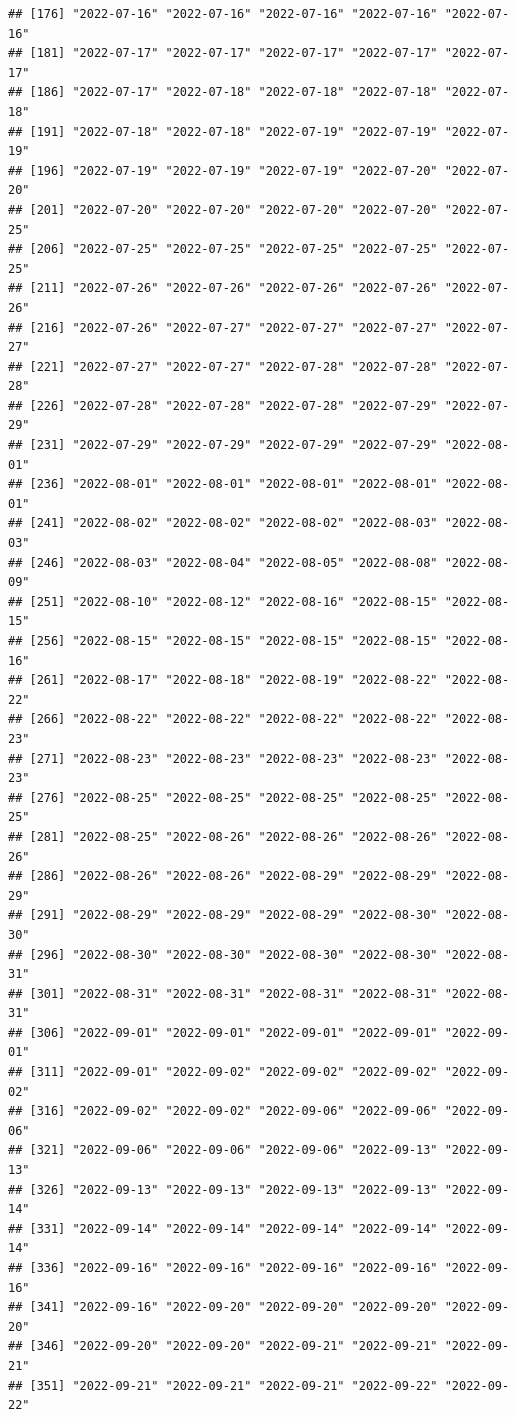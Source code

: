 \documentclass[
]{article}
\begin{document}
\begin{verbatim}
## [176] "2022-07-16" "2022-07-16" "2022-07-16" "2022-07-16" "2022-07-16"
## [181] "2022-07-17" "2022-07-17" "2022-07-17" "2022-07-17" "2022-07-17"
## [186] "2022-07-17" "2022-07-18" "2022-07-18" "2022-07-18" "2022-07-18"
## [191] "2022-07-18" "2022-07-18" "2022-07-19" "2022-07-19" "2022-07-19"
## [196] "2022-07-19" "2022-07-19" "2022-07-19" "2022-07-20" "2022-07-20"
## [201] "2022-07-20" "2022-07-20" "2022-07-20" "2022-07-20" "2022-07-25"
## [206] "2022-07-25" "2022-07-25" "2022-07-25" "2022-07-25" "2022-07-25"
## [211] "2022-07-26" "2022-07-26" "2022-07-26" "2022-07-26" "2022-07-26"
## [216] "2022-07-26" "2022-07-27" "2022-07-27" "2022-07-27" "2022-07-27"
## [221] "2022-07-27" "2022-07-27" "2022-07-28" "2022-07-28" "2022-07-28"
## [226] "2022-07-28" "2022-07-28" "2022-07-28" "2022-07-29" "2022-07-29"
## [231] "2022-07-29" "2022-07-29" "2022-07-29" "2022-07-29" "2022-08-01"
## [236] "2022-08-01" "2022-08-01" "2022-08-01" "2022-08-01" "2022-08-01"
## [241] "2022-08-02" "2022-08-02" "2022-08-02" "2022-08-03" "2022-08-03"
## [246] "2022-08-03" "2022-08-04" "2022-08-05" "2022-08-08" "2022-08-09"
## [251] "2022-08-10" "2022-08-12" "2022-08-16" "2022-08-15" "2022-08-15"
## [256] "2022-08-15" "2022-08-15" "2022-08-15" "2022-08-15" "2022-08-16"
## [261] "2022-08-17" "2022-08-18" "2022-08-19" "2022-08-22" "2022-08-22"
## [266] "2022-08-22" "2022-08-22" "2022-08-22" "2022-08-22" "2022-08-23"
## [271] "2022-08-23" "2022-08-23" "2022-08-23" "2022-08-23" "2022-08-23"
## [276] "2022-08-25" "2022-08-25" "2022-08-25" "2022-08-25" "2022-08-25"
## [281] "2022-08-25" "2022-08-26" "2022-08-26" "2022-08-26" "2022-08-26"
## [286] "2022-08-26" "2022-08-26" "2022-08-29" "2022-08-29" "2022-08-29"
## [291] "2022-08-29" "2022-08-29" "2022-08-29" "2022-08-30" "2022-08-30"
## [296] "2022-08-30" "2022-08-30" "2022-08-30" "2022-08-30" "2022-08-31"
## [301] "2022-08-31" "2022-08-31" "2022-08-31" "2022-08-31" "2022-08-31"
## [306] "2022-09-01" "2022-09-01" "2022-09-01" "2022-09-01" "2022-09-01"
## [311] "2022-09-01" "2022-09-02" "2022-09-02" "2022-09-02" "2022-09-02"
## [316] "2022-09-02" "2022-09-02" "2022-09-06" "2022-09-06" "2022-09-06"
## [321] "2022-09-06" "2022-09-06" "2022-09-06" "2022-09-13" "2022-09-13"
## [326] "2022-09-13" "2022-09-13" "2022-09-13" "2022-09-13" "2022-09-14"
## [331] "2022-09-14" "2022-09-14" "2022-09-14" "2022-09-14" "2022-09-14"
## [336] "2022-09-16" "2022-09-16" "2022-09-16" "2022-09-16" "2022-09-16"
## [341] "2022-09-16" "2022-09-20" "2022-09-20" "2022-09-20" "2022-09-20"
## [346] "2022-09-20" "2022-09-20" "2022-09-21" "2022-09-21" "2022-09-21"
## [351] "2022-09-21" "2022-09-21" "2022-09-21" "2022-09-22" "2022-09-22"

\end{verbatim}
\end{document}
